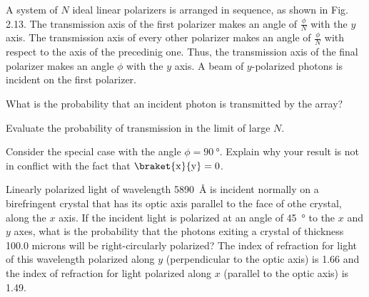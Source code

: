 \documentclass{../phys116}
\begin{document}
\begin{exercise}
  A system of \(N\) ideal linear polarizers is arranged in sequence,
  as shown in Fig. 2.13.  The transmission axis of the first polarizer
  makes an angle of \(\frac \phi N\) with the \(y\) axis.  The
  transmission axis of every other polarizer makes an angle of
  \(\frac \phi N\) with respect to the axis of the precedinig one.
  Thus, the transmission axis of the final polarizer makes an angle
  \(\phi\) with the \(y\) axis.  A beam of \(y\)-polarized photons is
  incident on the first polarizer.
  \begin{problems}
  \item What is the probability that an incident photon is transmitted
    by the array?
  \item Evaluate the probability of transmission in the limit of large
    \(N\).
  \item Consider the special case with the angle
    \(\phi = \SI{90}{\degree}\).  Explain why your result is not in
    conflict with the fact that \(\braket{\mathrm x}{\mathrm y} = 0\).
  \end{problems}
\end{exercise}

\begin{solution}
  \begin{problems}
  \item
  \item
  \item
  \end{problems}
\end{solution}

\begin{exercise}
  Linearly polarized light of wavelength \SI{5890}{\angstrom} is
  incident normally on a birefringent crystal that has its optic axis
  parallel to the face of othe crystal, along the \(x\) axis.  If the
  incident light is polarized at an angle of \SI{45}{\degree} to the
  \(x\) and \(y\) axes, what is the probability that the photons
  exiting a crystal of thickness \num{100.0} microns will be
  right-circularly polarized?  The index of refraction for light of
  this wavelength polarized along \(y\) (perpendicular to the optic
  axis) is \num{1.66} and the index of refraction for light polarized
  along \(x\) (parallel to the optic axis) is \num{1.49}.
\end{exercise}

\begin{solution}
\end{solution}
\end{document}
